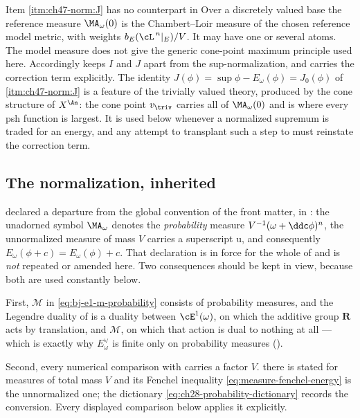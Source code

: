 \begin{warning}{Item \cref{itm:ch47-norm:J} has no counterpart in }
\label{warn:ch47-J-identity}
Over a discretely valued base the reference measure $\MA_\omega(0)$ is
the Chambert--Loir measure of the chosen reference model metric,
with weights $b_E(\cL^{\,n}|_E)/V$. It may have one or several atoms.
The model measure does not give the generic cone-point maximum
principle used here.  Accordingly
 keeps $I$ and $J$ apart from the sup-normalization,
and  carries the correction term
explicitly.  The identity
$J(\phi)=\sup\phi-E_\omega(\phi)=J_0(\phi)$ of
\,\cref{itm:ch47-norm:J} is a feature of
the trivially valued theory, produced by the cone structure of
$X^{\An}$: the cone point $v_{\triv}$ carries all of
$\MA_\omega(0)$ and is where every psh function is largest.  It is used
below whenever a normalized supremum is traded for an energy, and any
attempt to transplant such a step to  must reinstate the
correction term.
\end{warning}

\subsection{The normalization, inherited}
\label{sec:ch47-normalization}

 declared a departure from the global convention of
the front matter, in : the unadorned symbol
$\MA_\omega$ denotes the \emph{probability} measure
$V^{-1}(\omega+\ddc\phi)^n$, the unnormalized measure of mass $V$
carries a superscript $\mathrm u$, and consequently
$E_\omega(\phi+c)=E_\omega(\phi)+c$.  That declaration is in force for
the whole of  and is
\emph{not} repeated or amended here.  Two consequences should be kept in
view, because both are used constantly below.

First, $\mathcal M$ in \eqref{eq:bj-e1-m-probability} consists of
probability measures, and the Legendre duality of
 is a duality between $\cE^1(\omega)$, on which the
additive group $\mathbf R$ acts by translation, and $\mathcal M$, on
which that action is dual to nothing at all --- which is exactly why
$E^\vee_\omega$ is finite only on probability measures
().

Second, every numerical comparison with  carries a factor
$V$.   there is stated for measures of
total mass $V$ and its Fenchel inequality
\eqref{eq:measure-fenchel-energy} is the unnormalized one; the dictionary
\eqref{eq:ch28-probability-dictionary} records the conversion.  Every
displayed comparison below applies it explicitly.

